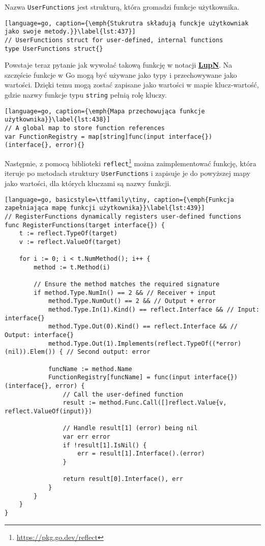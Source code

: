 Nazwa \texttt{UserFunctions} jest strukturą, która gromadzi funkcje użytkownika.

\begin{lstlisting}[language=go, caption={\emph{Stukrutra składują funckje użytkowniak jako swoje metody.}}\label{lst:437}]
// UserFunctions struct for user-defined, internal functions
type UserFunctions struct{}
\end{lstlisting}

Powstaje teraz pytanie jak wywołać takową funkcję w notacji \hyperlink{def:lupn}{\textbf{LupN}}. Na szczęście funkcje w Go mogą być używane jako typy i przechowywane jako wartości. Dzięki temu mogą zostać zapisane jako wartości w mapie klucz-wartość, gdzie nazwy funkcje typu \texttt{string} pełnią rolę kluczy.


\begin{lstlisting}[language=go, caption={\emph{Mapa przechowująca funkcje użytkownika}}\label{lst:438}]
// A global map to store function references
var FunctionRegistry = map[string]func(input interface{}) (interface{}, error){}
\end{lstlisting}

Następnie, z pomocą biblioteki \texttt{reflect}\footnote{\url{https://pkg.go.dev/reflect}} można zaimplementować funkcję, która iteruje po metodach struktury \texttt{UserFunctions} i zapisuje je do powyższej mapy jako wartości, dla których kluczami są nazwy funkcji. 

\begin{lstlisting}[language=go, basicstyle=\ttfamily\tiny, caption={\emph{Funkcja zapełniająca mapę funkcji użytkownika}}\label{lst:439}]
// RegisterFunctions dynamically registers user-defined functions
func RegisterFunctions(target interface{}) {
	t := reflect.TypeOf(target)
	v := reflect.ValueOf(target)

	for i := 0; i < t.NumMethod(); i++ {
		method := t.Method(i)

		// Ensure the method matches the required signature
		if method.Type.NumIn() == 2 && // Receiver + input
			method.Type.NumOut() == 2 && // Output + error
			method.Type.In(1).Kind() == reflect.Interface && // Input: interface{}
			method.Type.Out(0).Kind() == reflect.Interface && // Output: interface{}
			method.Type.Out(1).Implements(reflect.TypeOf((*error)(nil)).Elem()) { // Second output: error

			funcName := method.Name
			FunctionRegistry[funcName] = func(input interface{}) (interface{}, error) {
				// Call the user-defined function
				result := method.Func.Call([]reflect.Value{v, reflect.ValueOf(input)})

				// Handle result[1] (error) being nil
				var err error
				if !result[1].IsNil() {
					err = result[1].Interface().(error)
				}

				return result[0].Interface(), err
			}
		}
	}
}
\end{lstlisting}


